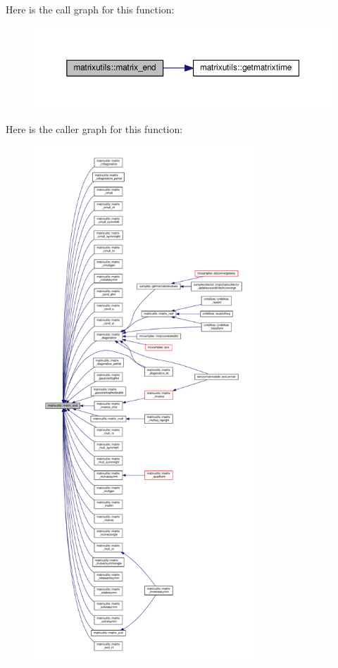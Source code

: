 Here is the call graph for this function\+:
\nopagebreak
\begin{figure}[H]
\begin{center}
\leavevmode
\includegraphics[width=350pt]{namespacematrixutils_aeb25ca6b661aed4516c029f0cd6003bc_cgraph}
\end{center}
\end{figure}
Here is the caller graph for this function\+:
\nopagebreak
\begin{figure}[H]
\begin{center}
\leavevmode
\includegraphics[height=550pt]{namespacematrixutils_aeb25ca6b661aed4516c029f0cd6003bc_icgraph}
\end{center}
\end{figure}
\mbox{\label{namespacematrixutils_a5a3ede7fff09728b5cacb5a559ab936f}} 
